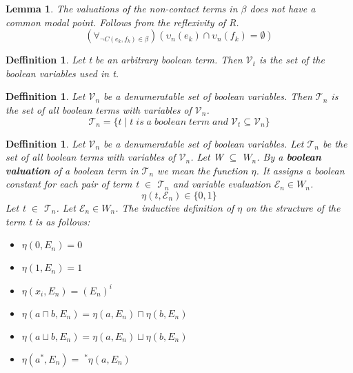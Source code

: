 \documentclass{article}
\newcommand\V{\mathcal{V}}
\newcommand\E{\mathcal{E}}
\newcommand\Tn{\mathcal{T}_n}
\newtheorem{lemma}[theorem]{Lemma}
\newtheorem{defn}[theorem]{Deffinition}
\begin{document}
		\begin{lemma}
			The valuations of the non-contact terms in $\beta$ does not have a common modal point. Follows from the reflexivity of R.
			\begin{equation}
				(\forall_{\neg C(e_k, f_k) \in \beta})(\upsilon_n(e_k) \cap \upsilon_n(f_k) = \emptyset)
			\end{equation}
		\end{lemma}

		\begin{defn}
			Let t be an arbitrary boolean term. Then $\V_t$ is the set of the boolean variables used in t.
		\end{defn}

		\begin{defn}
			Let $\V_n$ be a denumeratable set of boolean variables. Then $\Tn$ is the set of all boolean terms with variables of $\V_n$.
			\begin{equation}
				\Tn = \{t \mid t \;is\; a \;boolean \;term \;and \;\V_t \subseteq \V_n \}
			\end{equation}
		\end{defn}

		\begin{defn}
			Let $\V_n$ be a denumeratable set of boolean variables. Let $\Tn$ be the set of all boolean terms with variables of $\V_n$. Let W $\subseteq$ $W_n$. By a \textbf{boolean valuation} of a boolean term in $\Tn$ we mean the function $\eta$. It assigns a boolean constant for each pair of term t $\in$ $\Tn$ and variable evaluation $\E_n \in W_n$.
			\begin{equation}
				\eta(t, \E_n) \in \{0, 1\}
			\end{equation}
			Let t $\in$ $\Tn$. Let $\E_n \in W_n$. The inductive definition of $\eta$ on the structure of the term t is as follows:
			\begin{itemize}
				\item $\eta(0, E_n) = 0$
				\item $\eta(1, E_n) = 1$
				\item $\eta(x_i, E_n) = (E_n)^i$		
				\item $\eta(a \sqcap b, E_n) = \eta(a, E_n) \sqcap \eta(b, E_n)$
				\item $\eta(a \sqcup b, E_n) = \eta(a, E_n) \sqcup \eta(b, E_n)$
				\item $\eta(a^*, E_n) = \;^*\eta(a, E_n)$
			\end{itemize}
		\end{defn}
\end{document}
